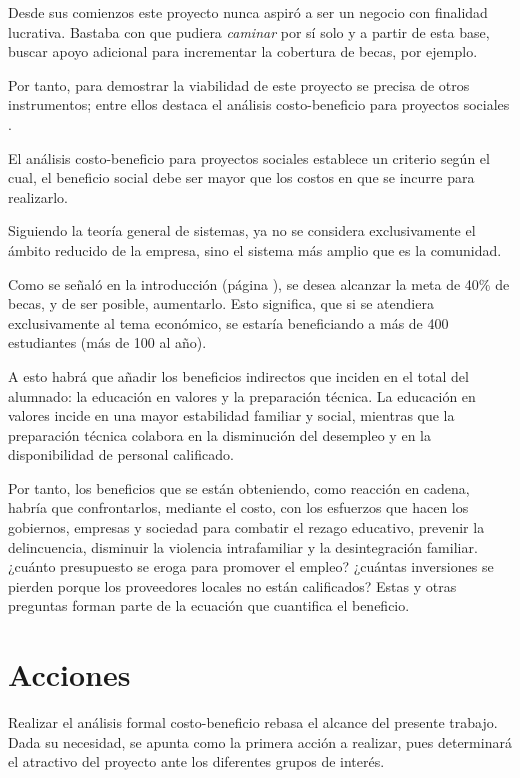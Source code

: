 Desde sus comienzos este proyecto nunca aspiró a ser un negocio con finalidad lucrativa.
Bastaba con que pudiera \emph{caminar} por sí solo y a partir de esta base, buscar apoyo adicional para incrementar la cobertura de becas, por ejemplo.

Por tanto, para demostrar la viabilidad de este proyecto se precisa de otros instrumentos; entre ellos destaca el análisis costo-beneficio para proyectos sociales \citep{Conant2004}.

El análisis costo-beneficio para proyectos sociales establece un criterio según el cual, el beneficio social debe ser mayor que los costos en que se incurre para realizarlo.

Siguiendo la teoría general de sistemas, ya no se considera exclusivamente el ámbito reducido de la empresa, sino el sistema más amplio que es la comunidad.

Como se señaló en la introducción (página \pageref{sub:sub:Beneficio:Social}), se desea alcanzar la meta de 40\% de becas, y de ser posible, aumentarlo. Esto significa, que si se atendiera exclusivamente al tema económico, se estaría beneficiando a más de 400 estudiantes (más de 100 al año).

A esto habrá que añadir los beneficios indirectos que inciden en el total del alumnado: la educación en valores y la preparación técnica. La educación en valores incide en una mayor estabilidad familiar y social, mientras que la preparación técnica colabora en la disminución del desempleo y en la disponibilidad de personal calificado.

Por tanto, los beneficios que se están obteniendo, como reacción en cadena, habría que confrontarlos, mediante el costo, con los esfuerzos que hacen los gobiernos, empresas y sociedad para combatir el rezago educativo, prevenir la delincuencia, disminuir la violencia intrafamiliar y la desintegración familiar. ¿cuánto presupuesto se eroga para promover el empleo? ¿cuántas inversiones se pierden porque los proveedores locales no están calificados? Estas y otras preguntas forman parte de la ecuación que cuantifica el beneficio.

\section*{Acciones}

Realizar el análisis formal costo-beneficio rebasa el alcance del presente trabajo. Dada su necesidad, se apunta como la primera acción a realizar, pues determinará el atractivo del proyecto ante los diferentes grupos de interés.

